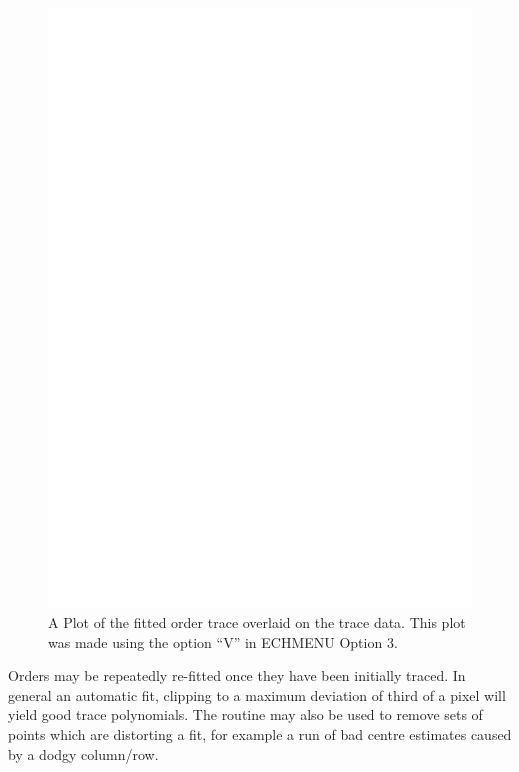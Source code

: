 \documentclass[11pt,twoside]{article}
\newcommand{\sunspec}[2]{#1}
\renewcommand{\sunspec}[2]{#2}
\begin{document}
\begin{figure}
\begin{center}
\includegraphics[width=\textwidth]{sun152_03.eps}

\parbox{140mm}{
\caption{A Plot of the fitted order trace overlaid on the trace data.
This plot was made using the option ``V'' in ECHMENU Option 3.}
\label{fi_tracefit}
}
\end{center}
\end{figure}

Orders may be repeatedly re-fitted once they have been initially traced.
In general an automatic fit, clipping to a maximum deviation of third of
a pixel will yield good trace polynomials. The routine may also be used
to remove sets of points which are distorting a fit, for example a run
of bad centre estimates caused by a dodgy column/row.
\end{document}
